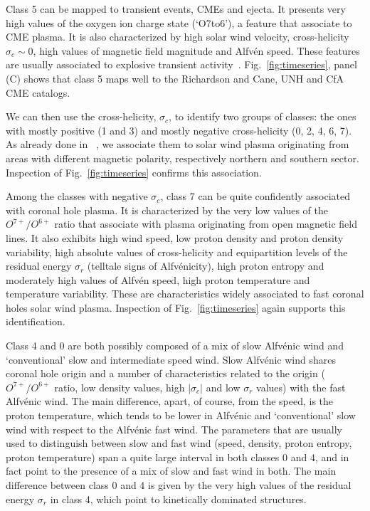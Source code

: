\documentclass[utf8]{frontiersSCNS} %
\begin{document}
Class 5 can be mapped to transient events, CMEs and ejecta. It presents very high values of the oxygen ion charge state (`O7to6'), a feature that \citep{Zhao2009, Stakhiv2015, Xu2015b} associate to CME plasma. It is also characterized by high solar wind velocity, cross-helicity $\sigma_c \sim 0$, high values of magnetic field magnitude and Alfv\'{e}n speed. These features are usually associated to explosive transient activity~\citep{Roberts2020, Xu2015b}. Fig.~\ref{fig:timeseries}, panel (C) shows that class 5 maps well to the Richardson and Cane, UNH and CfA CME catalogs.

We can then use the cross-helicity, $\sigma_c$, to identify two groups of classes: the ones with mostly positive (1 and 3) and mostly negative cross-helicity (0, 2, 4, 6, 7). As already done in ~\citep{Roberts2020}, we associate them to solar wind plasma originating from areas with different magnetic polarity, respectively northern and southern sector. Inspection of Fig.~\ref{fig:timeseries} confirms this association.

Among the classes with negative $\sigma_c$, class 7 can be quite confidently associated with coronal hole plasma. It is characterized by the very low values of the $O^{7+}/O^{6+}$  ratio that  \citep{Zhao2009, Stakhiv2015, Xu2015b} associate with plasma originating from open magnetic field lines. It also exhibits high wind speed, low proton density and proton density variability, high absolute values of cross-helicity and equipartition levels of the residual energy $\sigma_r$ (telltale signs of Alfv\'enicity), high proton entropy and moderately high values of Alfv\'en speed, high proton temperature and temperature variability. These are characteristics widely associated to fast coronal holes solar wind plasma. Inspection of Fig.~\ref{fig:timeseries} again supports this identification.

Class 4 and 0 are both possibly composed of a mix of slow Alfv\'enic wind \citep{DAmicis2015} and `conventional' slow and intermediate speed wind. Slow Alfv\'enic wind shares coronal hole origin and a number of characteristics related to the origin ($O^{7+}/O^{6+}$ ratio, low density values, high $|\sigma_c|$ and low $\sigma_r$ values) with the fast Alfv\'{e}nic wind. The main difference, apart, of course, from the speed, is the proton temperature, which tends to be lower in Alfv\'enic and `conventional' slow wind with respect to the Alfv\'enic fast wind. The parameters that are usually used to distinguish between slow and fast wind (speed, density, proton entropy, proton temperature) span a quite large interval in both classes 0 and 4, and in fact point to the presence of a mix of slow and fast wind in both. The main difference between class 0 and 4 is given by the very high values of the residual energy $\sigma_r$ in class 4, which point to kinetically dominated structures.
\end{document}

